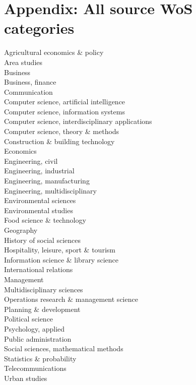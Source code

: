 \documentclass[a4paper]{article}
\begin{document}
\clearpage

\section{Appendix: All source WoS categories}
\begin{footnotesize}
Agricultural economics \& policy \\ Area studies \\ Business \\ Business, finance \\ Communication \\ Computer science, artificial intelligence \\ Computer science, information systems \\ Computer science, interdisciplinary applications \\ Computer science, theory \& methods \\ Construction \& building technology \\ Economics \\ Engineering, civil \\ Engineering, industrial \\ Engineering, manufacturing \\ Engineering, multidisciplinary \\ Environmental sciences \\ Environmental studies \\ Food science \& technology \\ Geography \\ History of social sciences \\ Hospitality, leisure, sport \& tourism \\ Information science \& library science \\ International relations \\ Management \\ Multidisciplinary sciences \\ Operations research \& management science \\ Planning \& development \\ Political science \\ Psychology, applied \\ Public administration \\ Social sciences, mathematical methods \\ Statistics \& probability \\ Telecommunications \\ Urban studies
\end{footnotesize}
\end{document}
